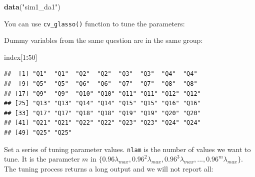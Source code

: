 \documentclass[12pt,]{krantz}
\makeatletter
\newenvironment{Shaded}{\begin{snugshade}}{\end{snugshade}}
\newcommand{\CharTok}[1]{\textcolor[rgb]{0.5,0.5,0.5}{#1}}
\newcommand{\CommentTok}[1]{\textcolor[rgb]{0.37,0.37,0.37}{\textit{#1}}}
\newcommand{\DecValTok}[1]{\textcolor[rgb]{0.06,0.06,0.06}{#1}}
\newcommand{\KeywordTok}[1]{\textcolor[rgb]{0.27,0.27,0.27}{\textbf{#1}}}
\newcommand{\NormalTok}[1]{#1}
\newcommand{\OperatorTok}[1]{\textcolor[rgb]{0.43,0.43,0.43}{\textbf{#1}}}
\newcommand{\StringTok}[1]{\textcolor[rgb]{0.5,0.5,0.5}{#1}}
\newenvironment{kframe}{%
\medskip{}
\setlength{\fboxsep}{.8em}
 \def\at@end@of@kframe{}%
 \ifinner\ifhmode%
  \def\at@end@of@kframe{\end{minipage}}%
  \begin{minipage}{\columnwidth}%
 \fi\fi%
 \def\FrameCommand##1{\hskip\@totalleftmargin \hskip-\fboxsep
 \colorbox{shadecolor}{##1}\hskip-\fboxsep
     \hskip-\linewidth \hskip-\@totalleftmargin \hskip\columnwidth}%
 \MakeFramed {\advance\hsize-\width
   \@totalleftmargin\z@ \linewidth\hsize
   \@setminipage}}%
 {\par\unskip\endMakeFramed%
 \at@end@of@kframe}
\renewenvironment{Shaded}{\begin{kframe}}{\end{kframe}}
\makeatother
\begin{document}
\begin{Shaded}
\begin{Highlighting}[]
\KeywordTok{data}\NormalTok{(}\StringTok{"sim1_da1"}\NormalTok{)}
\end{Highlighting}
\end{Shaded}

You can use \texttt{cv\_glasso()} function to tune the parameters:

\begin{Shaded}
\end{Shaded}

Dummy variables from the same question are in the same group:

\begin{Shaded}
\begin{Highlighting}[]
\NormalTok{index[}\DecValTok{1}\OperatorTok{:}\DecValTok{50}\NormalTok{]}
\end{Highlighting}
\end{Shaded}

\begin{verbatim}
##  [1] "Q1"  "Q1"  "Q2"  "Q2"  "Q3"  "Q3"  "Q4"  "Q4" 
##  [9] "Q5"  "Q5"  "Q6"  "Q6"  "Q7"  "Q7"  "Q8"  "Q8" 
## [17] "Q9"  "Q9"  "Q10" "Q10" "Q11" "Q11" "Q12" "Q12"
## [25] "Q13" "Q13" "Q14" "Q14" "Q15" "Q15" "Q16" "Q16"
## [33] "Q17" "Q17" "Q18" "Q18" "Q19" "Q19" "Q20" "Q20"
## [41] "Q21" "Q21" "Q22" "Q22" "Q23" "Q23" "Q24" "Q24"
## [49] "Q25" "Q25"
\end{verbatim}

Set a series of tuning parameter values. \texttt{nlam} is the number of values we want to tune. It is the parameter \(m\) in \(\{0.96\lambda_{max},0.96^{2}\lambda_{max},0.96^{3}\lambda_{max},...,0.96^{m}\lambda_{max}\}\). The tuning process returns a long output and we will not report all:
\end{document}
